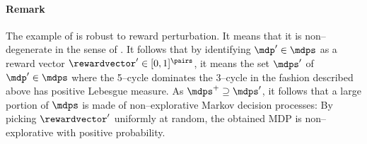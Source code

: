 \documentclass[preprint,cleveref,12pt]{colt2025}
\def\model{\mdp}
\def\models{\mdps}
\def\reward{\rewardvector}
\begin{document}
    \paragraph{Remark}
    The example of  is robust to reward perturbation.
    It means that it is {non--degenerate} in the sense of .
    It follows that by identifying $\model' \in \models$ as a reward vector $\reward' \in [0, 1]^\pairs$, it means the set $\models'$ of $\model' \in \models$ where the 5--cycle dominates the 3--cycle in the fashion described above has positive Lebesgue measure. 
    As $\models^+ \supseteq \models'$, it follows that a large portion of $\models$ is made of non--explorative Markov decision processes: By picking $\reward'$ uniformly at random, the obtained MDP is non--explorative with positive probability. 
\end{document}
